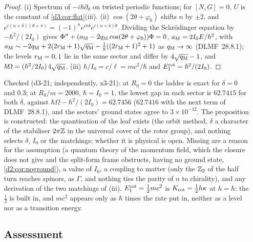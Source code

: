 \begin{proof}
(i) Spectrum of $-i\hbar\partial_\theta$ on twisted periodic functions; for $[N,G]=0$, $U$ is the constant of \cref{d3:cor:flat}(iii). (ii)
$\cos(2\theta+\varphi_0)$ shifts $n$ by $\pm2$, and $e^{i(n+\delta)(\theta+\pi)}=(-1)^ne^{i\pi\delta}e^{i(n+\delta)\theta}$. Dividing the Schr\"odinger equation by
$-\hbar^2/(2I_0)$ gives $\Phi''+(a_{\rm M}-2q_{\rm M}\cos(2\theta+\varphi_0))\Phi=0$, $a_{\rm M}=2I_0E/\hbar^2$, with
$a_{\rm M}\sim-2q_{\rm M}+2(2r_{\rm M}+1)\sqrt{q_{\rm M}}-\tfrac18((2r_{\rm M}+1)^2+1)$ as $q_{\rm M}\to\infty$ (DLMF~28.8.1); the levels $r_{\rm M}=0,1$ lie in the same sector and
differ by $4\sqrt{q_{\rm M}}-1$, and $\hbar\Omega=(\hbar^2/2I_0)\,4\sqrt{q_{\rm M}}$. (iii) $\hbar/I_0=c/\ell=mc^2/\hbar$ and $E^{\rm rot}_1=\hbar^2/(2I_0)$.
\end{proof}

Checked (d3-21; independently, x3-21): at $R_0=0$ the ladder is exact for $\delta=0$ and $0.3$; at $R_0/m=2000$, $\hbar=I_0=1$, the lowest gap in each
sector is $62.7415$ for both $\delta$, against $\hbar\Omega-\hbar^2/(2I_0)=62.7456$ ($62.7416$ with the next term of DLMF~28.8.1), and the sectors' ground
states agree to $3\times10^{-12}$. The proposition is constructed: the quantisation of the leaf exists (the orbit method, $\delta$ a character of the
stabiliser $2\pi\mathbb{Z}$ in the universal cover of the rotor group), and nothing selects $\delta$, $I_0$ or the matchings; whether it is physical is open.
Missing are a reason for the assumption (a quantum theory of the momentum field, which the closure does not give and the split-form frame obstructs,
having no ground state, \cref{d2:cor:noground}), a value of $I_0$, a coupling to matter (only the $\mathbb{Z}_2$ of the half turn reaches spinors, as $\Gamma$,
and nothing ties the parity of $n$ to chirality), and any derivation of the two matchings of (iii). $E^{\rm rot}_1=\tfrac12mc^2$ is
$K_{\rm rot}=\tfrac12h\kappa$ at $h=\hbar$: the $\tfrac12$ is built in, and $mc^2$ appears only as $\hbar$ times the rate put in, neither as a level nor
as a transition energy.

\subsection{Assessment}
\label{d3:sec:assess}


